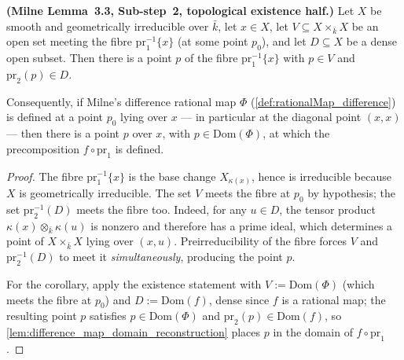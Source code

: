 \begin{lemma}\leanok
  \label{lem:milne33_slice_existence}

  \textbf{(Milne Lemma~3.3, Sub-step~2, topological existence half.)} Let \(X\) be
  smooth and geometrically irreducible over \(\bar k\), let \(x \in X\), let
  \(V \subseteq X \times_{\bar k} X\) be an open set meeting the fibre
  \(\mathrm{pr}_1^{-1}\{x\}\) (at some point \(p_0\)), and let \(D \subseteq X\) be a
  dense open subset. Then there is a point \(p\) of the fibre
  \(\mathrm{pr}_1^{-1}\{x\}\) with \(p \in V\) and \(\mathrm{pr}_2(p) \in D\).

  Consequently, if Milne's difference rational map \(\Phi\)
  (\cref{def:rationalMap_difference}) is defined at a point \(p_0\) lying over
  \(x\) --- in particular at the diagonal point \((x, x)\) --- then there is a
  point \(p\) over \(x\), with \(p \in \mathrm{Dom}(\Phi)\), at which the
  precomposition \(f \circ \mathrm{pr}_1\) is defined.
\end{lemma}
\begin{proof}\leanok
  The fibre \(\mathrm{pr}_1^{-1}\{x\}\) is the base change
  \(X_{\kappa(x)}\), hence is irreducible because \(X\) is geometrically
  irreducible. The set \(V\) meets the fibre at \(p_0\) by hypothesis;
  the set \(\mathrm{pr}_2^{-1}(D)\) meets the fibre too. Indeed, for any
  \(u\in D\), the tensor product \(\kappa(x)\otimes_{\bar k}\kappa(u)\)
  is nonzero and therefore has a prime ideal, which determines a point of
  \(X\times_{\bar k}X\) lying over \((x,u)\).
  Preirreducibility of the fibre forces \(V\) and \(\mathrm{pr}_2^{-1}(D)\) to
  meet it \emph{simultaneously}, producing the point \(p\).

  For the corollary, apply the existence statement with \(V := \mathrm{Dom}(\Phi)\)
  (which meets the fibre at \(p_0\)) and \(D := \mathrm{Dom}(f)\), dense since
  \(f\) is a rational map; the resulting point \(p\) satisfies
  \(p \in \mathrm{Dom}(\Phi)\) and \(\mathrm{pr}_2(p) \in \mathrm{Dom}(f)\), so
  \cref{lem:difference_map_domain_reconstruction} places \(p\) in the domain of
  \(f \circ \mathrm{pr}_1\).
\end{proof}

